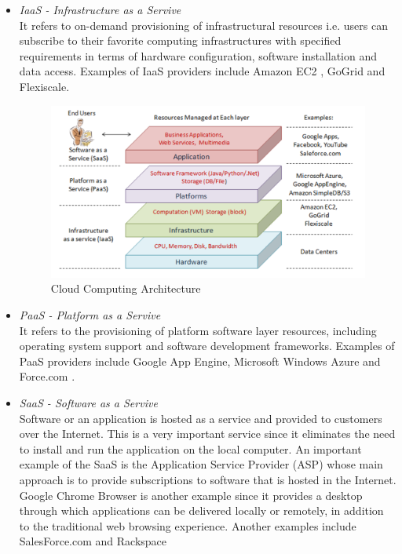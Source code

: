 \begin{itemize}
\item \textit{IaaS - Infrastructure as a Servive }\\
It refers to on-demand provisioning of infrastructural resources i.e. users can subscribe to their favorite computing infrastructures with specified requirements in terms of hardware configuration, software installation and data access. Examples of IaaS providers include Amazon EC2 \cite{iaas:AmazonEC2} , GoGrid \cite{iaas:GoGrid} and Flexiscale\cite{iaas:FlexiScale}.  \\


\begin{figure}[h]
    \centering
    \includegraphics[width=\textwidth]{cloudArchitecture}
    \caption{Cloud Computing Architecture \cite{cloud:Archi}}
    \label{fig:cloudArchitecture}
\end{figure}

\item \textit{PaaS - Platform as a Servive }\\
It refers to the provisioning of platform software layer resources, including operating system support and software development frameworks. Examples of PaaS providers include Google App Engine, Microsoft Windows Azure and Force.com \cite{paas:Force}.\\

\item \textit{SaaS - Software as a Servive }\\
Software or an application is hosted as a service and provided to customers over the Internet. This is a very important service since it eliminates the need to install and run the application on the local computer. An important example of the SaaS is the Application Service Provider (ASP) whose main approach is to provide subscriptions to software that is hosted in the Internet. Google Chrome Browser is another example since it provides a desktop through which applications can be delivered locally or remotely, in addition to the traditional web browsing experience. Another examples include SalesForce.com and Rackspace \cite{saas:RackSpace}\\
\end{itemize}


